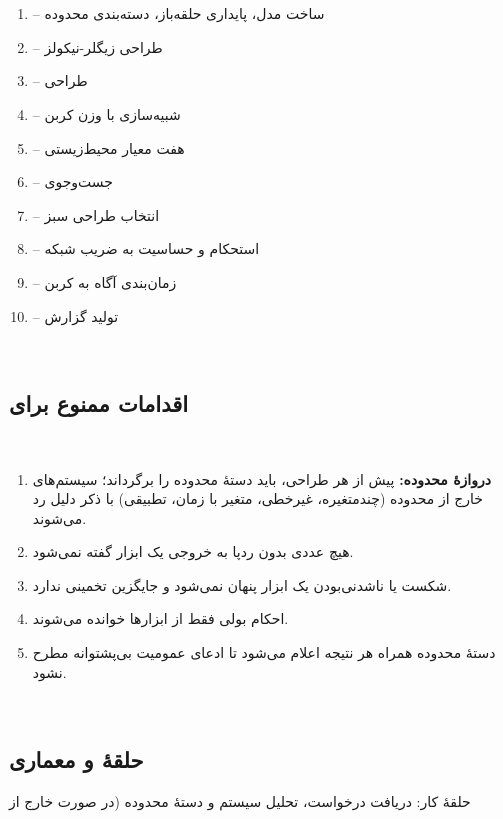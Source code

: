 ‫\documentclass[a4paper,12pt]{article}
\begin{document}
‫\begin{enumerate}
‫\item \texttt{} -- ساخت مدل، پایداری حلقه‌باز، دسته‌بندی محدوده
‫\item \texttt{} -- طراحی  زیگلر-نیکولز
‫\item \texttt{} -- طراحی 
‫\item \texttt{} -- شبیه‌سازی  با وزن کربن
‫\item \texttt{} -- هفت معیار محیط‌زیستی
‫\item \texttt{} -- جست‌وجوی 
‫\item \texttt{} -- انتخاب طراحی سبز
‫\item \texttt{} -- استحکام  و حساسیت به ضریب شبکه
‫\item \texttt{} -- زمان‌بندی آگاه به کربن
‫\item \texttt{} -- تولید گزارش 
‫\end{enumerate}
‫
‫\subsection{اقدامات ممنوع برای }
‫\begin{enumerate}
‫\item \textbf{دروازهٔ محدوده:} پیش از هر طراحی، \texttt{} باید دستهٔ محدوده را برگرداند؛ سیستم‌های خارج از محدوده (چندمتغیره، غیرخطی، متغیر با زمان، تطبیقی) با ذکر دلیل رد می‌شوند.
‫\item هیچ عددی بدون ردپا به خروجی یک ابزار گفته نمی‌شود.
‫\item شکست یا ناشدنی‌بودن یک ابزار پنهان نمی‌شود و جایگزین تخمینی ندارد.
‫\item احکام بولی فقط از ابزارها خوانده می‌شوند.
‫\item دستهٔ محدوده همراه هر نتیجه اعلام می‌شود تا ادعای عمومیت بی‌پشتوانه مطرح نشود.
‫\end{enumerate}
‫
‫\subsection{حلقهٔ  و معماری}
‫حلقهٔ کار: دریافت درخواست، تحلیل سیستم و دستهٔ محدوده (در صورت خارج از
\end{document}
